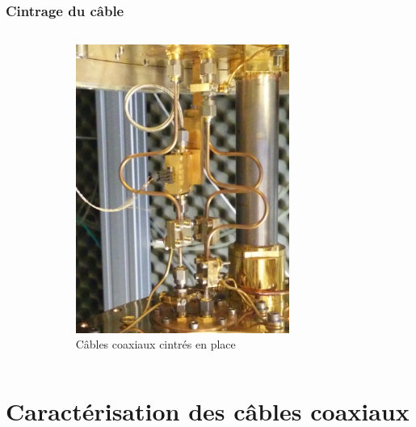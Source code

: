 \documentclass[10pt,a9paper,handout]{beamer} \usepackage[utf8]{inputenc} \usepackage[francais]{babel} \usepackage[T1]{fontenc}
\begin{document}
\begin{frame}
\frametitle{Cintrage du câble}
\begin{columns}
\begin{column}{0.5\textwidth}
    \begin{description}
        \item[]~\\
    \end{description}
\end{column}
\begin{column}{0.5\textwidth}
\begin{figure}[h]
    \begin{center}
        \includegraphics[width=0.7\textwidth]{Images/Coax/cintrage}
        \caption{Câbles coaxiaux cintrés en place}
    \end{center}
\end{figure}
\end{column}
\end{columns}
\end{frame}

\section{Caractérisation des câbles coaxiaux}
\end{document}
